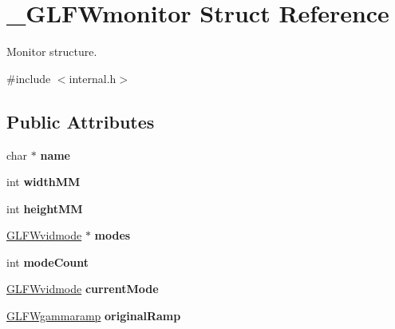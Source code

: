 \hypertarget{struct__GLFWmonitor}{}\section{\+\_\+\+G\+L\+F\+Wmonitor Struct Reference}
\label{struct__GLFWmonitor}


Monitor structure.  




{\ttfamily \#include $<$internal.\+h$>$}

\subsection*{Public Attributes}
\begin{DoxyCompactItemize}
\item 
\hypertarget{struct__GLFWmonitor_a4a16862fdbfa4476d76917f2f125a959}{}char $\ast$ {\bfseries name}\label{struct__GLFWmonitor_a4a16862fdbfa4476d76917f2f125a959}

\item 
\hypertarget{struct__GLFWmonitor_a4d0e40c8dc4d7913e5e78a81955a834f}{}int {\bfseries width\+M\+M}\label{struct__GLFWmonitor_a4d0e40c8dc4d7913e5e78a81955a834f}

\item 
\hypertarget{struct__GLFWmonitor_ae5f696ed8a038e0aba539cb52a04b887}{}int {\bfseries height\+M\+M}\label{struct__GLFWmonitor_ae5f696ed8a038e0aba539cb52a04b887}

\item 
\hypertarget{struct__GLFWmonitor_a012dd72ff0ab06cf46bb78951adac67f}{}\hyperlink{structGLFWvidmode}{G\+L\+F\+Wvidmode} $\ast$ {\bfseries modes}\label{struct__GLFWmonitor_a012dd72ff0ab06cf46bb78951adac67f}

\item 
\hypertarget{struct__GLFWmonitor_a49766384d467b40c9bb362459761418f}{}int {\bfseries mode\+Count}\label{struct__GLFWmonitor_a49766384d467b40c9bb362459761418f}

\item 
\hypertarget{struct__GLFWmonitor_ab2a33bceb848570cca7b213fcddb9e84}{}\hyperlink{structGLFWvidmode}{G\+L\+F\+Wvidmode} {\bfseries current\+Mode}\label{struct__GLFWmonitor_ab2a33bceb848570cca7b213fcddb9e84}

\item 
\hypertarget{struct__GLFWmonitor_a64188202c44980245af7cb1ce9a24d44}{}\hyperlink{structGLFWgammaramp}{G\+L\+F\+Wgammaramp} {\bfseries original\+Ramp}\label{struct__GLFWmonitor_a64188202c44980245af7cb1ce9a24d44}


\end{DoxyCompactItemize}
